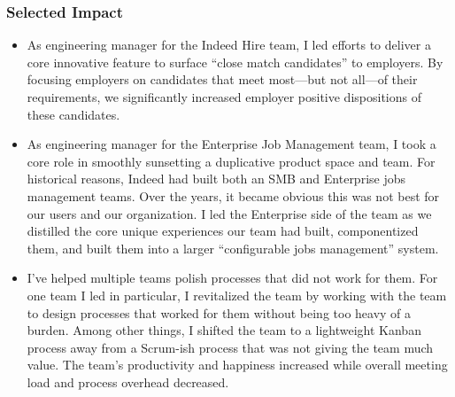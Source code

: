 \documentclass[11pt]{amsart}
\begin{document}
\begin{tcolorbox}[
	title=Software Engineering Manager \textcolor{DarkGray}{/} Indeed,
	after title={\hfill2019 \textcolor{DarkGray}{$\rightarrow$} Present \textcolor{DarkGray}{(5 years)}}
]
\subsubsection{Selected Impact}

\begin{itemize}[noitemsep, leftmargin=2em, label=\raisebox{0.25ex}{\tiny$\bullet$}]
	\item As engineering manager for the Indeed Hire team, I led efforts to deliver a core innovative feature to surface ``close match candidates'' to employers. By focusing employers on candidates that meet most—but not all—of their requirements, we significantly increased employer positive dispositions of these candidates.
	\item As engineering manager for the Enterprise Job Management team, I took a core role in smoothly sunsetting a duplicative product space and team. For historical reasons, Indeed had built both an SMB and Enterprise jobs management teams. Over the years, it became obvious this was not best for our users and our organization. I led the Enterprise side of the team as we distilled the core unique experiences our team had built, componentized them, and built them into a larger ``configurable jobs management'' system.
	\item I've helped multiple teams polish processes that did not work for them. For one team I led in particular, I revitalized the team by working with the team to design processes that worked for them without being too heavy of a burden. Among other things, I shifted the team to a lightweight Kanban process away from a Scrum-ish process that was not giving the team much value. The team's productivity and happiness increased while overall meeting load and process overhead decreased. %
\end{itemize}

\end{tcolorbox}
\end{document}
